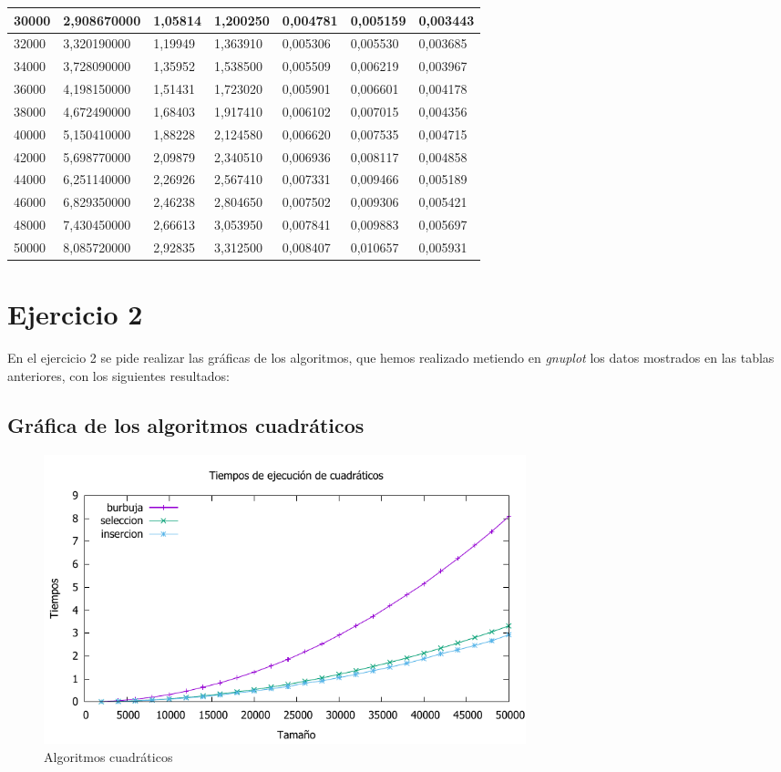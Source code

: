 \documentclass[a4paper, 11pt]{article}
\begin{document}
\begin{tabular}{|l|l|l|l|l|l|l|}
	\hline
	30000&	2,908670000&	1,05814&	1,200250&	0,004781&	0,005159&	0,003443\\
	\hline
	32000&	3,320190000&	1,19949&	1,363910&	0,005306&	0,005530&	0,003685\\
	\hline
	34000&	3,728090000&	1,35952&	1,538500&	0,005509&	0,006219&	0,003967\\
	\hline
	36000&	4,198150000&	1,51431&	1,723020&	0,005901&	0,006601&	0,004178\\
	\hline
	38000&	4,672490000&	1,68403&	1,917410&	0,006102&	0,007015&	0,004356\\
	\hline
	40000&	5,150410000&	1,88228&	2,124580&	0,006620&	0,007535&	0,004715\\
	\hline
	42000&	5,698770000&	2,09879&	2,340510&	0,006936&	0,008117&	0,004858\\
	\hline
	44000&	6,251140000&	2,26926&	2,567410&	0,007331&	0,009466&	0,005189\\
	\hline
	46000&	6,829350000&	2,46238&	2,804650&	0,007502&	0,009306&	0,005421\\
	\hline
	48000&	7,430450000&	2,66613&	3,053950&	0,007841&	0,009883&	0,005697\\
	\hline
	50000&	8,085720000&	2,92835&	3,312500&	0,008407&	0,010657&	0,005931\\
	\hline
\end{tabular}

\newpage
\section{Ejercicio 2}

En el ejercicio 2 se pide realizar las gráficas de los algoritmos, que hemos
realizado metiendo en \textit{gnuplot} los datos mostrados en las tablas anteriores,
con los siguientes resultados:

\subsection{Gráfica de los algoritmos cuadráticos}
\begin{figure}[h] \includegraphics[width=14cm]{comparativa_cuadraticos_g} \centering
	\caption{Algoritmos cuadráticos} \end{figure}
\end{document}
